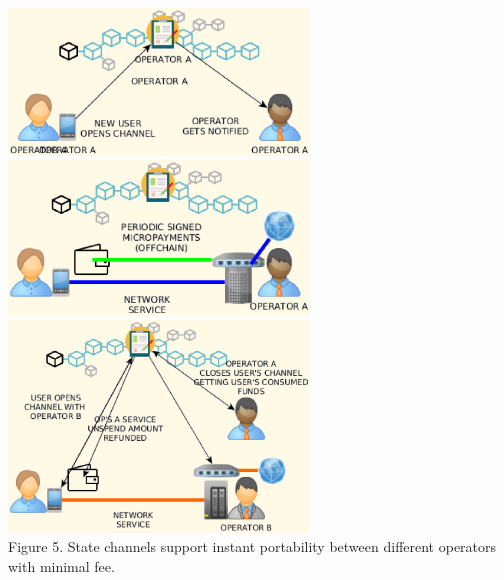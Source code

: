 \documentclass[12pt]{amsart}
\begin{document}
\begin{center}
  \includegraphics[keepaspectratio, width=0.6\textwidth]{images/bc5g/sc1-y.eps}
  \includegraphics[keepaspectratio, width=0.6\textwidth]{images/bc5g/sc2-y.eps}
  \includegraphics[keepaspectratio, width=0.6\textwidth]{images/bc5g/sc3-y.eps}
\\
Figure 5. State channels support instant portability
between different operators with minimal fee.
\\
\end{center}
\begin{multicols}{2}


\end{multicols}
\end{document}
